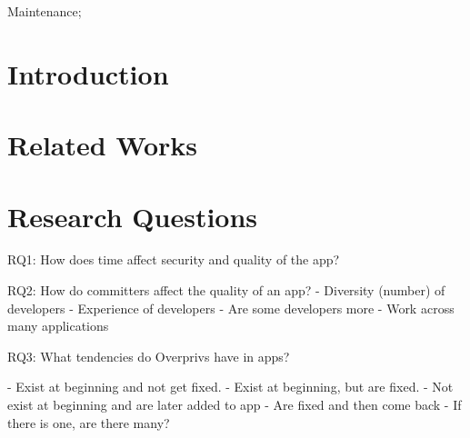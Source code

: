 \documentclass{sig-alternate}
\begin{document}
Maintenance;









\section{Introduction}








\section{Related Works}
\label{sec: relatedworks}


% 






\section{Research Questions}
\label{sec: researchquestions}


RQ1: How does time affect security and quality of the app?



RQ2: How do committers affect the quality of an app?
- Diversity (number) of developers
- Experience of developers
- Are some developers more
- Work across many applications 





RQ3: What tendencies do Overprivs have in apps?

- Exist at beginning and not get fixed.
- Exist at beginning, but are fixed.
- Not exist at beginning and are later added to app
- Are fixed and then come back
- If there is one, are there many?
\end{document}
